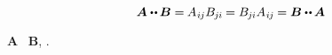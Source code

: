 \noindent
{}

\nopagebreak\vspace{-0.4em}
\begin{equation}\label{doubledotcommutativity.tensoralgebra}
\bm{A} \dotdotp \hspace{-0.1ex} \bm{B}
= \hspace{-0.1ex} A_{\hspace{.1ex}i\hspace{-0.1ex}j} B_{\hspace{-0.1ex}j\hspace{-0.06ex}i} \hspace{-0.1ex}
= B_{\hspace{-0.1ex}j\hspace{-0.06ex}i} A_{\hspace{.1ex}i\hspace{-0.1ex}j} \hspace{-0.1ex}
= \bm{B} \dotdotp \hspace{-0.1ex} \bm{A}
\end{equation}

\vspace{-0.4em}\noindent
{}
${\bm{A}}$ ~${\bm{B}}$,
.

\newcommand\colonproductinquotes{\hbox{\hspace{-0.2ex}\inquotes{${\smash{\colonp}\hspace{.15ex}}$}\hspace{-0.2ex}}}

